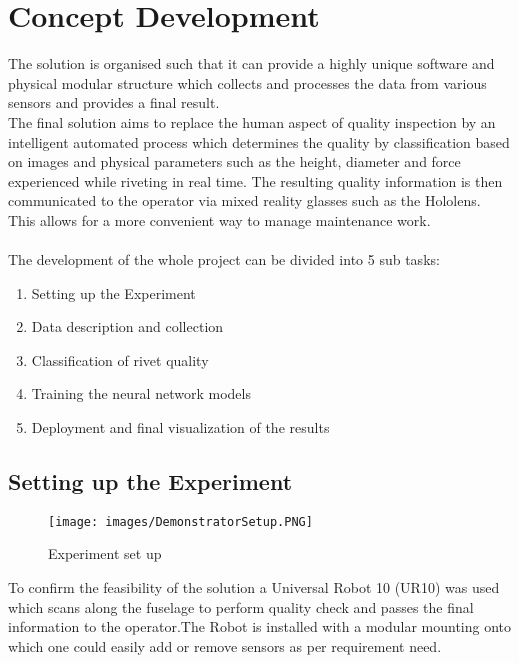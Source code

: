\documentclass{article}
\begin{document}
\section{Concept Development}

The solution is organised such that it can provide a highly unique software and physical modular structure which collects and processes the data from various sensors and provides a final result.\\

The final solution aims to replace the human aspect of quality inspection by an intelligent automated process which determines the quality by classification based on images and physical parameters such as the height, diameter and force experienced while riveting in real time. The resulting quality information is then communicated to the operator via mixed reality glasses such as the Hololens. This allows for a more convenient way to manage maintenance work.\\\\
The development of the whole project can be divided into 5 sub tasks:

\begin{enumerate}
\item Setting up the Experiment
\item Data description and collection
\item Classification of rivet quality 
\item Training the neural network models
\item Deployment and final visualization of the results

\end{enumerate}




\subsection{Setting up the Experiment}


\begin{figure}[H]
        \centering
        \texttt{[image: images/DemonstratorSetup.PNG]}
        \caption{Experiment set up }
         \label{fig:ExperimentSetUp}
        \end{figure}

To confirm the feasibility of the solution a Universal Robot 10 (UR10) was used which scans along the fuselage  to perform quality check and passes the final information to the operator.The Robot is installed with a modular mounting onto which one could easily add or remove sensors as per requirement need.
\end{document}
